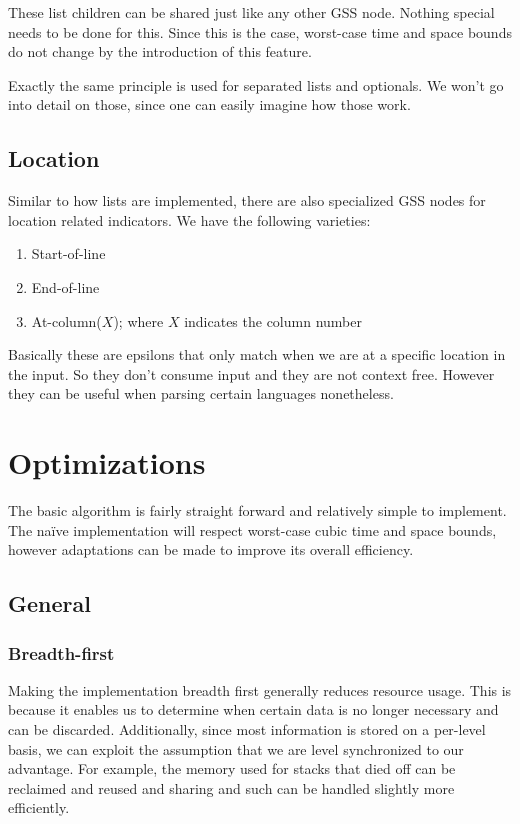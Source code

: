 \documentclass[a4paper,10pt]{article}
\begin{document}
These list children can be shared just like any other GSS node. Nothing special needs to be done for this. Since this is the case, worst-case time and space bounds do not change by the introduction of this feature.

Exactly the same principle is used for separated lists and optionals. We won't go into detail on those, since one can easily imagine how those work.

\subsection{Location}

Similar to how lists are implemented, there are also specialized GSS nodes for location related indicators. We have the following varieties:
\begin{enumerate}
 \setlength{\itemsep}{0pt}
 \setlength{\parskip}{0pt}
 \setlength{\parsep}{0pt}
 
 \item Start-of-line
 \item End-of-line
 \item At-column($X$); where $X$ indicates the column number
\end{enumerate}
Basically these are epsilons that only match when we are at a specific location in the input. So they don't consume input and they are not context free. However they can be useful when parsing certain languages nonetheless.

\section{Optimizations}

The basic algorithm is fairly straight forward and relatively simple to implement. The naïve implementation will respect worst-case cubic time and space bounds, however adaptations can be made to improve its overall efficiency.

\subsection{General}

\subsubsection{Breadth-first}
Making the implementation breadth first generally reduces resource usage. This is because it enables us to determine when certain data is no longer necessary and can be discarded. Additionally, since most information is stored on a per-level basis, we can exploit the assumption that we are level synchronized to our advantage. For example, the memory used for stacks that died off can be reclaimed and reused and sharing and such can be handled slightly more efficiently.
\end{document}
